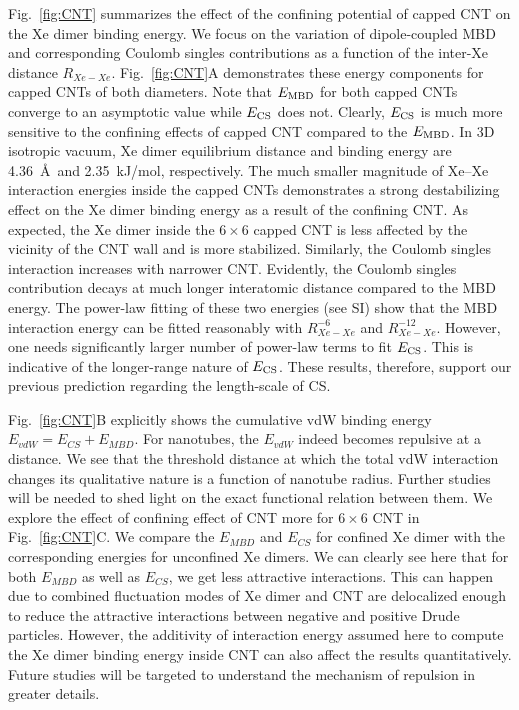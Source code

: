 \documentclass[aps,prl,groupaddress, twocolumn]{revtex4-1}  %
\begin{document}
Fig.~\ref{fig:CNT} summarizes the effect of the confining potential of capped CNT on the Xe dimer binding energy. We focus on the variation of dipole-coupled MBD and corresponding Coulomb singles contributions as a function of the inter-Xe distance $R_{Xe-Xe}$. Fig.~\ref{fig:CNT}A demonstrates these energy components for capped CNTs of both diameters. Note that $E_{\rm MBD}$ for both capped CNTs converge to an asymptotic value while $E_{\rm CS}$ does not. Clearly, $E_{\rm CS}$ is much more sensitive to the confining effects of capped CNT compared to the $E_{\rm MBD}$. In 3D isotropic vacuum, Xe dimer equilibrium distance and binding energy are 4.36~\AA\ and 2.35~kJ/mol, respectively\cite{Jerabek_2017}. The much smaller magnitude of Xe--Xe interaction energies inside the capped CNTs demonstrates a strong destabilizing effect on the Xe dimer binding energy as a result of the confining CNT\@. As expected, the Xe dimer inside the $6\times6$ capped CNT is less affected by the vicinity of the CNT wall and is more stabilized. Similarly, the Coulomb singles interaction increases with narrower CNT\@. Evidently, the Coulomb singles contribution decays at much longer interatomic distance compared to the MBD energy. The power-law fitting of these two energies (see SI) show that the MBD interaction energy can be fitted reasonably with $R_{Xe-Xe}^{-6}$ and $R_{Xe-Xe}^{-12}$. However, one needs significantly larger number of power-law terms to fit $E_{\rm CS}$. This is indicative of the longer-range nature of $E_{\rm CS}$. These results, therefore, support our previous prediction regarding the length-scale of CS\cite{sadhukhan_prl_2017, sadhukhan_prl_reply2018}.

Fig.~\ref{fig:CNT}B explicitly shows the cumulative vdW binding energy $E_{vdW} = E_{CS} + E_{MBD}$. For nanotubes, the $E_{vdW}$ indeed becomes repulsive at a distance. We see that the threshold distance at which the total vdW interaction changes its qualitative nature is a function of nanotube radius. Further studies will be needed to shed light on the exact functional relation between them.
We explore the effect of confining effect of CNT more for $6\times 6$ CNT in Fig.~\ref{fig:CNT}C. We compare the $E_{MBD}$ and $E_{CS}$ for confined Xe dimer with the corresponding energies for unconfined Xe dimers. We can clearly see here that for both $E_{MBD}$ as well as $E_{CS}$, we get less attractive interactions. This can happen due to combined fluctuation modes of Xe dimer and CNT are delocalized enough to reduce the attractive interactions between negative and positive Drude particles. However, the additivity of interaction energy assumed here to compute the Xe dimer binding energy inside CNT can also affect the results quantitatively. Future studies will be targeted to understand the mechanism of repulsion in greater details.    
\end{document}
